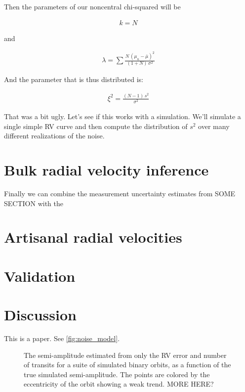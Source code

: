 \documentclass[modern, letterpaper]{aastex63}
\begin{document}
Then the parameters of our noncentral chi-squared will be

\begin{eqnarray}
	k = N
\end{eqnarray}

and

\begin{eqnarray}
	\lambda = \sum \frac{N\,(\mu_n - \bar{\mu})^2}{(1 + N)\,\sigma^2}
\end{eqnarray}

And the parameter that is thus distributed is:

\begin{eqnarray}
	\xi^2 = \frac{(N - 1)\,s^2}{\sigma^2}
\end{eqnarray}

That was a bit ugly.
Let's see if this works with a simulation.
We'll simulate a single simple RV curve and then compute the distribution of $s^2$ over many different realizations of the noise.

\section{Bulk radial velocity inference}

Finally we can combine the measurement uncertainty estimates from SOME SECTION with the

\section{Artisanal radial velocities}

\section{Validation}

\section{Discussion}

This is a paper.
See \autoref{fig:noise_model}.


\begin{figure}
	\caption{The semi-amplitude estimated from only the RV error and number of transits for a suite of simulated binary orbits, as a function of the true simulated semi-amplitude.
		The points are colored by the eccentricity of the orbit showing a weak trend. MORE HERE?
		\label{fig:recovered}}
\end{figure}
\end{document}
